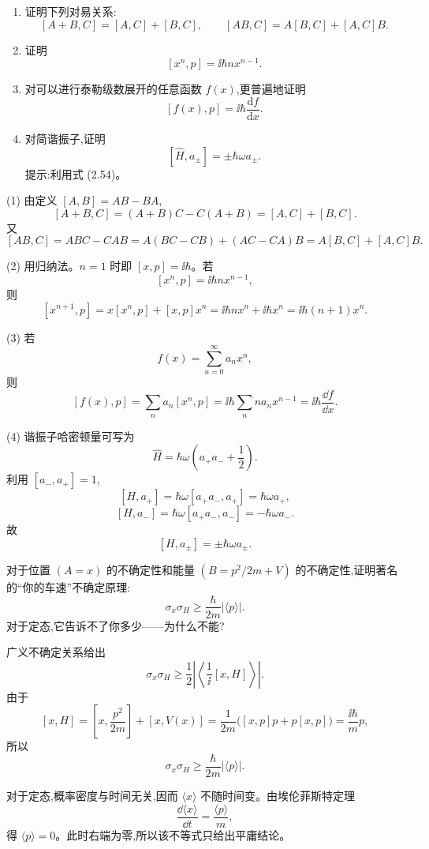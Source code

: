 \begin{question}
\begin{enumerate}
\item 证明下列对易关系:
\[
[A+B,C]=[A,C]+[B,C],\qquad [AB,C]=A[B,C]+[A,C]B.
\]
\item 证明
\[
[x^n,p]=\ii\hbar n x^{n-1}.
\]
\item 对可以进行泰勒级数展开的任意函数 $f(x)$,更普遍地证明
\[
[f(x),p]=\ii\hbar\frac{\mathrm df}{\mathrm dx}.
\tag{3.66}
\]
\item 对简谐振子,证明
\[
[\hat H,a_\pm]=\pm\hbar\omega a_\pm .
\tag{3.67}
\]
提示:利用式 (2.54)。
\end{enumerate}

\par\smallskip
{}

\begin{solution}
(1) 由定义 $[A,B]=AB-BA$,
\[
[A+B,C]=(A+B)C-C(A+B)=[A,C]+[B,C].
\]
又
\[
[AB,C]=ABC-CAB=A(BC-CB)+(AC-CA)B=A[B,C]+[A,C]B.
\]

(2) 用归纳法。$n=1$ 时即 $[x,p]=\ii\hbar$。若
\[
[x^n,p]=\ii\hbar n x^{n-1},
\]
则
\[
[x^{n+1},p]=x[x^n,p]+[x,p]x^n
=\ii\hbar n x^n+\ii\hbar x^n
=\ii\hbar(n+1)x^n.
\]

(3) 若
\[
f(x)=\sum_{n=0}^{\infty}a_nx^n,
\]
则
\[
[f(x),p]=\sum_n a_n[x^n,p]
=\ii\hbar\sum_n n a_nx^{n-1}
=\ii\hbar\frac{\dd f}{\dd x}.
\]

(4) 谐振子哈密顿量可写为
\[
\hat H=\hbar\omega\left(a_+a_-+\frac12\right).
\]
利用 $[a_-,a_+]=1$,
\[
[H,a_+]=\hbar\omega[a_+a_-,a_+]=\hbar\omega a_+,
\]
\[
[H,a_-]=\hbar\omega[a_+a_-,a_-]=-\hbar\omega a_-.
\]
故
\[
\boxed{[H,a_\pm]=\pm\hbar\omega a_\pm.}
\]
\end{solution}
\end{question}

\begin{question}
对于位置 $(A=x)$ 的不确定性和能量 $(B=p^2/2m+V)$ 的不确定性,证明著名的“你的车速”不确定原理:
\[
\sigma_x\sigma_H\geq \frac{\hbar}{2m}|\langle p\rangle|.
\]
对于定态,它告诉不了你多少——为什么不能?
\begin{solution}
广义不确定关系给出
\[
\sigma_x\sigma_H\ge \frac12\left|\left\langle\frac1\ii[x,H]\right\rangle\right|.
\]
由于
\[
[x,H]=\left[x,\frac{p^2}{2m}\right]+[x,V(x)]
=\frac1{2m}\bigl([x,p]p+p[x,p]\bigr)
=\frac{\ii\hbar}{m}p,
\]
所以
\[
\boxed{\sigma_x\sigma_H\ge \frac{\hbar}{2m}|\langle p\rangle|.}
\]

对于定态,概率密度与时间无关,因而 $\langle x\rangle$ 不随时间变。由埃伦菲斯特定理
\[
\frac{\dd\langle x\rangle}{\dd t}=\frac{\langle p\rangle}{m},
\]
得 $\langle p\rangle=0$。此时右端为零,所以该不等式只给出平庸结论。
\end{solution}
\end{question}

